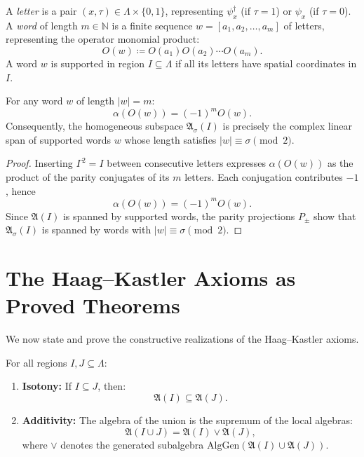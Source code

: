 \begin{definition}
A \emph{letter} is a pair $(x, \tau) \in \Lambda \times \{0, 1\}$, representing $\psi_x^\dagger$ (if $\tau = 1$) or $\psi_x$ (if $\tau = 0$). A \emph{word} of length $m \in \mathbb{N}$ is a finite sequence $w = [a_1, a_2, \dots, a_m]$ of letters, representing the operator monomial product:
\begin{equation}
O(w) \coloneqq O(a_1) O(a_2) \cdots O(a_m).
\end{equation}
A word $w$ is supported in region $I \subseteq \Lambda$ if all its letters have spatial coordinates in $I$.
\end{definition}

\begin{lemma}
\label{lem:word_parity}
For any word $w$ of length $|w| = m$:
\begin{equation}
\alpha(O(w)) = (-1)^m O(w).
\end{equation}
Consequently, the homogeneous subspace $\mathfrak{A}_\sigma(I)$ is precisely the complex linear span of supported words $w$ whose length satisfies $|w| \equiv \sigma \pmod 2$.
\end{lemma}

\begin{proof}
Inserting $\Gamma^2=I$ between consecutive letters expresses $\alpha(O(w))$ as the product of the parity conjugates of its $m$ letters. Each conjugation contributes $-1$, hence
\begin{equation}
\alpha(O(w))=(-1)^m O(w).
\end{equation}
Since $\mathfrak{A}(I)$ is spanned by supported words, the parity projections $P_\pm$ show that $\mathfrak{A}_\sigma(I)$ is spanned by words with $|w|\equiv\sigma\pmod 2$.
\end{proof}

\section{The Haag--Kastler Axioms as Proved Theorems}

We now state and prove the constructive realizations of the Haag--Kastler axioms.

\begin{theorem}
\label{thm:isotony_additivity}
For all regions $I, J \subseteq \Lambda$:
\begin{enumerate}
    \item \textbf{Isotony:} If $I \subseteq J$, then:
    \begin{equation}
    \mathfrak{A}(I) \subseteq \mathfrak{A}(J).
    \end{equation}
    \item \textbf{Additivity:} The algebra of the union is the supremum of the local algebras:
    \begin{equation}
    \mathfrak{A}(I \cup J) = \mathfrak{A}(I) \vee \mathfrak{A}(J),
    \end{equation}
    where $\vee$ denotes the generated subalgebra $\mathrm{AlgGen}(\mathfrak{A}(I) \cup \mathfrak{A}(J))$.
\end{enumerate}
\end{theorem}

